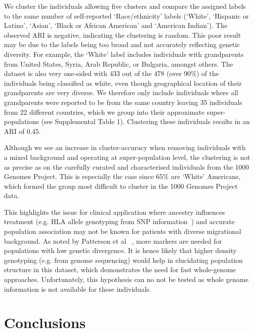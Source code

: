 \documentclass{bmcart}
\begin{document}
We cluster the individuals allowing five clusters and compare the assigned labels to the same number of self-reported `Race/ethnicity' labels (`White', `Hispanic or Latino', `Asian', `Black or African American' and `American Indian').
The observed ARI is negative, indicating the clustering is random. 
This poor result may be due to the labels being too broad and not accurately reflecting genetic diversity. For example, the `White' label includes individuals with grandparents from United States, Syria, Arab Republic, or Bulgaria, amongst others. 
The dataset is also very one-sided with 433 out of the 478 (over 90\%) of the individuals being classified as white, even though geographical location of their grandparents are very diverse.
We therefore only include individuals where all grandparents were reported to be from the same country leaving 35 individuals from 22 different countries, which we group into their approximate super-populations (see Supplemental Table 1). 
Clustering these individuals results in an ARI of 0.45. 

Although we see an increase in cluster-accuracy when removing individuals with a mixed background and operating at super-population level, the clustering is not as precise as on the carefully curated and characterised individuals from the 1000 Genomes Project.
This is especially the case since 65\% are `White' Americans, which formed the group most difficult to cluster in the 1000 Genomes Project data.

This highlights the issue for clinical application where ancestry influences treatment (e.g. HLA allele genotyping from SNP information~\cite{Zheng2014}) and accurate population association may not be known for patients with diverse migrational background.
As noted by Patterson et al ~\cite{Patterson2006}, more markers are needed for populations with low genetic divergence. 
It is hence likely that higher density genotyping (e.g. from genome sequencing) would help in elucidating population structure in this dataset, which demonstrates the need for fast whole-genome approaches. 
Unfortunately, this hypothesis can no not be tested as whole genome information is not available for these individuals. 




\section*{Conclusions}
\end{document}
